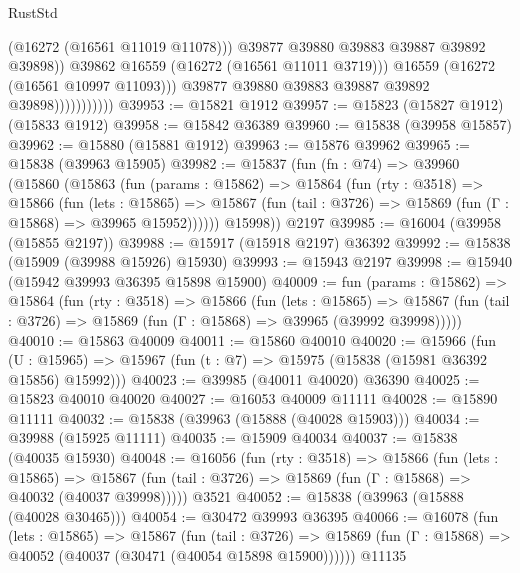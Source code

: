 \begin{lexlean}{RustStd}
\begin{coremodule}
                                    (@16272 (@16561 @11019 @11078)))
                                  @39877
                                  @39880
                                  @39883
                                  @39887
                                  @39892
                                  @39898))
                              @39862
                              @16559
                              (@16272 (@16561 @11011 @3719)))
                            @16559
                            (@16272 (@16561 @10997 @11093)))
                          @39877
                          @39880
                          @39883
                          @39887
                          @39892
                          @39898)))))))))))
@39953 := @15821 @1912
@39957 := @15823 (@15827 @1912) (@15833 @1912)
@39958 := @15842 @36389
@39960 := @15838 (@39958 @15857)
@39962 := @15880 (@15881 @1912)
@39963 := @15876 @39962
@39965 := @15838 (@39963 @15905)
@39982 := @15837
    (fun (fn : @74) =>
    @39960
      (@15860
        (@15863
          (fun (params : @15862) =>
          @15864
            (fun (rty : @3518) =>
            @15866
              (fun (lets : @15865) =>
              @15867 (fun (tail : @3726) => @15869 (fun (Γ : @15868) => @39965 @15952))))))
        @15998))
    @2197
@39985 := @16004 (@39958 (@15855 @2197))
@39988 := @15917 (@15918 @2197) @36392
@39992 := @15838 (@15909 (@39988 @15926) @15930)
@39993 := @15943 @2197
@39998 := @15940 (@15942 @39993 @36395 @15898 @15900)
@40009 := fun (params : @15862) =>
  @15864
    (fun (rty : @3518) =>
    @15866
      (fun (lets : @15865) =>
      @15867 (fun (tail : @3726) => @15869 (fun (Γ : @15868) => @39965 (@39992 @39998)))))
@40010 := @15863 @40009
@40011 := @15860 @40010
@40020 := @15966
    (fun (U : @15965) => @15967 (fun (t : @7) => @15975 (@15838 (@15981 @36392 @15856) @15992)))
@40023 := @39985 (@40011 @40020) @36390
@40025 := @15823 @40010 @40020
@40027 := @16053 @40009 @11111
@40028 := @15890 @11111
@40032 := @15838 (@39963 (@15888 (@40028 @15903)))
@40034 := @39988 (@15925 @11111)
@40035 := @15909 @40034
@40037 := @15838 (@40035 @15930)
@40048 := @16056
    (fun (rty : @3518) =>
    @15866
      (fun (lets : @15865) =>
      @15867 (fun (tail : @3726) => @15869 (fun (Γ : @15868) => @40032 (@40037 @39998)))))
    @3521
@40052 := @15838 (@39963 (@15888 (@40028 @30465)))
@40054 := @30472 @39993 @36395
@40066 := @16078
    (fun (lets : @15865) =>
    @15867
      (fun (tail : @3726) =>
      @15869 (fun (Γ : @15868) => @40052 (@40037 (@30471 (@40054 @15898 @15900))))))
    @11135

\end{coremodule}
\end{lexlean}

